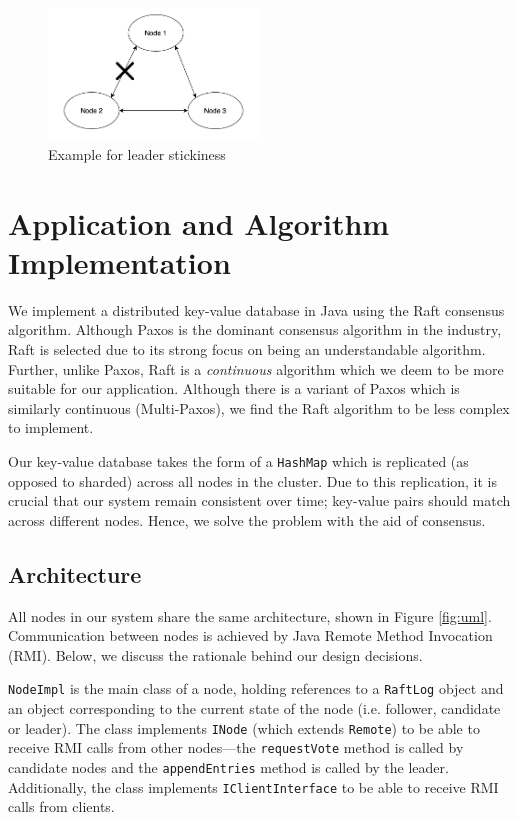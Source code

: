 \documentclass[12pt, a4paper]{article}
\begin{document}
  \begin{figure}[htp]
    \centering
    \includegraphics[width=0.5\textwidth]{img/network-partition-example.png}
    \caption{Example for leader stickiness}
    \label{fig:network-partition-example}
  \end{figure}

\section{Application and Algorithm Implementation} \label{sec:application}
We implement a distributed key-value database in Java using the Raft consensus algorithm. Although Paxos is the dominant consensus algorithm in the industry, Raft is selected due to its strong focus on being an understandable algorithm. Further, unlike Paxos, Raft is a \textit{continuous} algorithm which we deem to be more suitable for our application. Although there is a variant of Paxos which is similarly continuous (Multi-Paxos), we find the Raft algorithm to be less complex to implement.

Our key-value database takes the form of a \texttt{HashMap} which is replicated (as opposed to sharded) across all nodes in the cluster. Due to this replication, it is crucial that our system remain consistent over time; key-value pairs should match across different nodes. Hence, we solve the problem with the aid of consensus.

\subsection{Architecture}
All nodes in our system share the same architecture, shown in Figure \ref{fig:uml}. Communication between nodes is achieved by Java Remote Method Invocation (RMI). Below, we discuss the rationale behind our design decisions.

\texttt{NodeImpl} is the main class of a node, holding references to a \texttt{RaftLog} object and an object corresponding to the current state of the node (i.e. follower, candidate or leader). The class implements \texttt{INode} (which extends \texttt{Remote}) to be able to receive RMI calls from other nodes---the \texttt{requestVote} method is called by candidate nodes and the \texttt{appendEntries} method is called by the leader. Additionally, the class implements \texttt{IClientInterface} to be able to receive RMI calls from clients.
\end{document}
